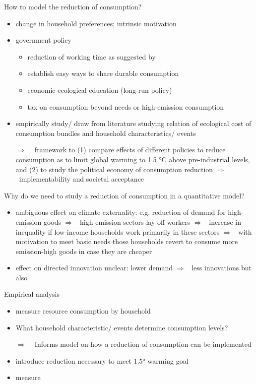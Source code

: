 \documentclass[11pt,aspectratio=169]{beamer}
\newcommand{\ar}{$\Rightarrow$ \ }
\begin{document}
\begin{frame}{How to model the reduction of consumption?}
	\begin{itemize}
		\item change in household preferences; intrinsic motivation
		\item government policy 
		\begin{itemize}
				\item reduction of working time as suggested by \cite{GoughCANGREEN}
				\item establish easy ways to share durable consumption
				\item economic-ecological education (long-run policy)
				\item tax on consumption beyond needs or high-emission consumption 
		\end{itemize}
	\item empirically study/ draw from literature studying relation of ecological cost of consumption bundles and household characteristics/ events 
	\item[\ar] framework to (1) compare effects of different policies to reduce consumption as to limit global warming to 1.5 °C above pre-industrial levels, and (2) to study the  political economy of consumption reduction \ar implementability and societal acceptance
	\end{itemize}
\end{frame}
\begin{frame}{Why do we need to study a reduction of consumption in a quantitative model?}
	\begin{itemize}
\item ambiguous effect on climate externality: e.g. reduction of demand for high-emission goods \ar high-emission sectors lay off workers \ar increase in inequality if low-income households work primarily in these sectors \ar with motivation to meet basic needs those households revert to consume more emission-high goods in case they are cheaper
\item effect on directed innovation unclear: lower demand \ar less innovations but also  

	\end{itemize}
\end{frame}

\begin{frame}

	Empirical analysis
	\begin{itemize}
		\item measure resource consumption by household
		\item What household characteristic/ events determine consumption levels?
		\item[\ar] Informs model on how a reduction of consumption can be implemented
		\item introduce reduction necessary to meet 1.5° warming goal
		\item measure 
	\end{itemize}
\end{frame}
\end{document}
